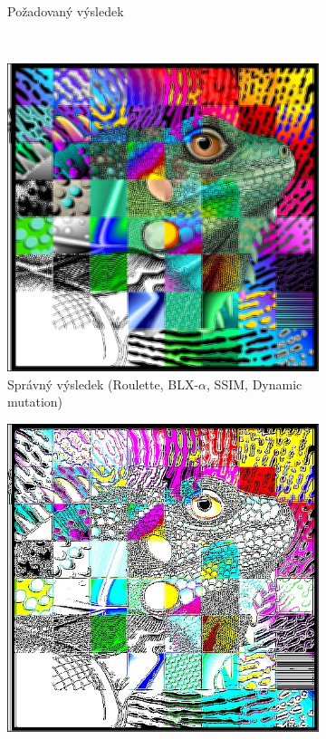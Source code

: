 \documentclass[a4paper,11pt,titlepage]{scrartcl}
\begin{document}
\begin{figure}[!h]
\begin{subfigure}[b]{0.40\textwidth}
        \caption{Požadovaný výsledek}
        \label{fig:gull}
    \end{subfigure}
    \\
    \begin{subfigure}[b]{0.32\textwidth}
        \includegraphics[width=\textwidth]{img/roulette-blx_a-ssim-dynamic_example2.jpg}
        \caption{Správný výsledek (Roulette, BLX-$\alpha$, SSIM, Dynamic mutation)}
        \label{fig:ex21}
    \end{subfigure}
    \begin{subfigure}[b]{0.32\textwidth}
        \includegraphics[width=\textwidth]{img/roulette-blx_a-ssim-swap_example2.jpg}

\end{subfigure}
\end{figure}
\end{document}
